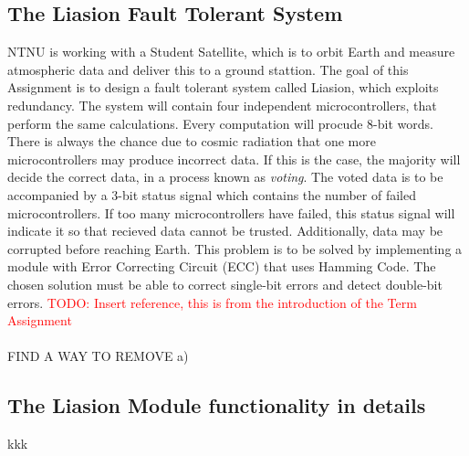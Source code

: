 \documentclass[a4paper]{IEEEtran}
\newcommand\TODO[1]{\textcolor{red}{TODO:#1}}
\newcommand\todo[1]{\TODO{#1}}
\begin{document}
\subsection{The Liasion Fault Tolerant System}
NTNU is working with a Student Satellite, which is to orbit Earth and measure atmospheric data and deliver this to a ground stattion. The goal of this Assignment is to design a fault tolerant system called Liasion, which exploits redundancy. The system will contain four independent microcontrollers, that perform the same calculations. Every computation will procude 8-bit words. There is always the chance due to cosmic radiation that one more microcontrollers may produce incorrect data. If this is the case, the majority will decide the correct data, in a process known as \textit{voting}. The voted data is to be accompanied by a 3-bit status signal which contains the number of failed microcontrollers. If too many microcontrollers have failed, this status signal will indicate it so that recieved data cannot be trusted. Additionally, data may be corrupted before reaching Earth. This problem is to be solved by implementing a module with Error Correcting Circuit (ECC) that uses Hamming Code. The chosen solution must be able to correct single-bit errors and detect double-bit errors.
\break 
\todo{ Insert reference, this is from the introduction of the Term Assignment}
\paragraph{}
FIND A WAY TO REMOVE a)


\subsection{The Liasion Module functionality in details}
kkk
\end{document}
